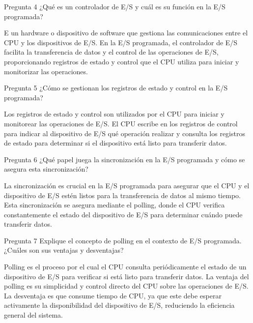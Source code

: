 \documentclass[presentation]{beamer}
\begin{document}
\begin{frame}[label={sec:org0108229}]{Pregunta 4}
¿Qué es un controlador de E/S y cuál es su función en la E/S programada?


E un hardware o dispositivo de software que gestiona las comunicaciones entre el CPU y los dispositivos de E/S. En la E/S programada, el controlador de E/S facilita la transferencia de datos y el control de las operaciones de E/S, proporcionando registros de estado y control que el CPU utiliza para iniciar y monitorizar las operaciones.
\end{frame}

\begin{frame}[label={sec:orgc9fcad0}]{Pregunta 5}
¿Cómo se gestionan los registros de estado y control en la E/S programada?


Los registros de estado y control son utilizados por el CPU para iniciar y monitorear las operaciones de E/S. El CPU escribe en los registros de control para indicar al dispositivo de E/S qué operación realizar y consulta los registros de estado para determinar si el dispositivo está listo para transferir datos.
\end{frame}

\begin{frame}[label={sec:org9e515d0}]{Pregunta 6}
¿Qué papel juega la sincronización en la E/S programada y cómo se asegura esta sincronización?


La sincronización es crucial en la E/S programada para asegurar que el CPU y el dispositivo de E/S estén listos para la transferencia de datos al mismo tiempo. Esta sincronización se asegura mediante el polling, donde el CPU verifica constantemente el estado del dispositivo de E/S para determinar cuándo puede transferir datos.
\end{frame}

\begin{frame}[label={sec:org6f3003d}]{Pregunta 7}
Explique el concepto de polling en el contexto de E/S programada. ¿Cuáles son sus ventajas y desventajas?

Polling es el proceso por el cual el CPU consulta periódicamente el estado de un dispositivo de E/S para verificar si está listo para transferir datos. La ventaja del polling es su simplicidad y control directo del CPU sobre las operaciones de E/S. La desventaja es que consume tiempo de CPU, ya que este debe esperar activamente la disponibilidad del dispositivo de E/S, reduciendo la eficiencia general del sistema.
\end{frame}
\end{document}
